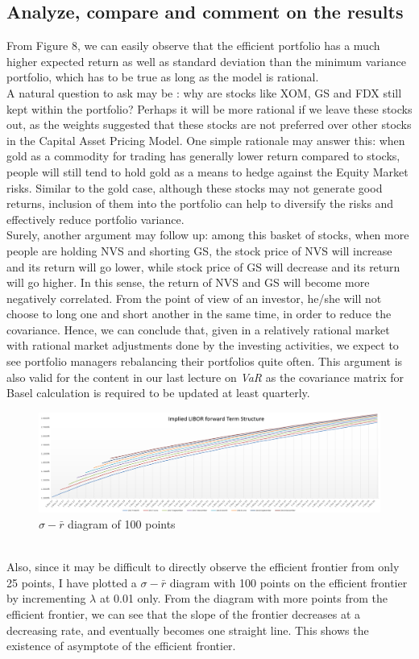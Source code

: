 \subsection{Analyze, compare and comment on the results}
From Figure 8, we can easily observe that the efficient portfolio has a much higher expected return as well as standard deviation than the minimum variance portfolio, which has to be true as long as the model is rational.\\[4mm]
A natural question to ask may be : why are stocks like XOM, GS and FDX still kept within the portfolio? Perhaps it will be more rational if we leave these stocks out, as the weights suggested that these stocks are not preferred over other stocks in the Capital Asset Pricing Model. One simple rationale may answer this: when gold as a commodity for trading has generally lower return compared to stocks, people will still tend to hold gold as a means to hedge against the Equity Market risks. Similar to the gold case, although these stocks may not generate good returns, inclusion of them into the portfolio can help to diversify the risks and effectively reduce portfolio variance.\\[4mm]
Surely, another argument may follow up: among this basket of stocks, when more people are holding NVS and shorting GS, the stock price of NVS will increase and its return will go lower, while stock price of GS will decrease and its return will go higher. In this sense, the return of NVS and GS will become more negatively correlated. From the point of view of an investor, he/she will not choose to long one and short another in the same time, in order to reduce the covariance. Hence, we can conclude that, given in a relatively rational market with rational market adjustments done by the investing activities, we expect to see portfolio managers rebalancing their portfolios quite often. This argument is also valid for the content in our last lecture on \emph{VaR} as the covariance matrix for Basel calculation is required to be updated at least quarterly.
\begin{figure}[h]
	\centering
	\includegraphics[scale=0.5]{biu.PNG}
	\caption{$\sigma-\bar{r}$ diagram of 100 points}
\end{figure}
\\[4mm]Also, since it may be difficult to directly observe the efficient frontier from only 25 points, I have plotted a $\sigma-\bar{r}$ diagram with 100 points on the efficient frontier by incrementing $\lambda$ at 0.01 only. From the diagram with more points from the efficient frontier, we can see that the slope of the frontier decreases at a decreasing rate, and eventually becomes one straight line. This shows the existence of asymptote of the efficient frontier.
